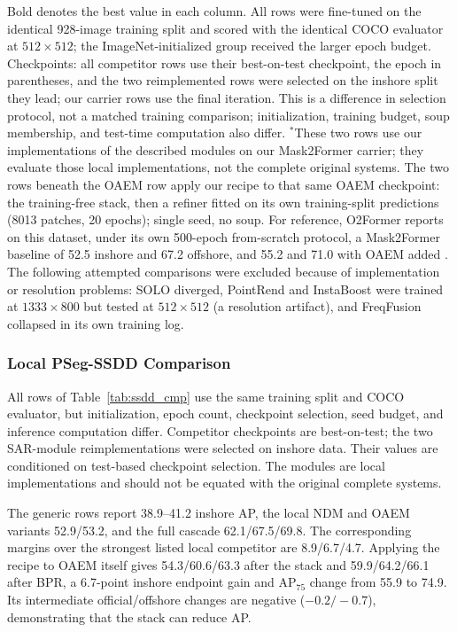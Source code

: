 \begin{table}[!t]
\parbox{\textwidth}{\footnotesize Bold denotes the best value in each column. All rows were fine-tuned on the identical 928-image training split and scored with the identical COCO evaluator at $512\times512$; the ImageNet-initialized group received the larger epoch budget. Checkpoints: all competitor rows use their best-on-test checkpoint, the epoch in parentheses, and the two reimplemented rows were selected on the inshore split they lead; our carrier rows use the final iteration. This is a difference in selection protocol, not a matched training comparison; initialization, training budget, soup membership, and test-time computation also differ. $^{\ast}$These two rows use our implementations of the described modules on our Mask2Former carrier; they evaluate those local implementations, not the complete original systems. The two rows beneath the OAEM row apply our recipe to that same OAEM checkpoint: the training-free stack, then a refiner fitted on its own training-split predictions (8013 patches, 20 epochs); single seed, no soup. For reference, O2Former reports on this dataset, under its own 500-epoch from-scratch protocol, a Mask2Former baseline of 52.5 inshore and 67.2 offshore, and 55.2 and 71.0 with OAEM added \cite{o2former2025}. The following attempted comparisons were excluded because of implementation or resolution problems: SOLO diverged, PointRend and InstaBoost were trained at $1333\times800$ but tested at $512\times512$ (a resolution artifact), and FreqFusion collapsed in its own training log.}
\end{table}



\subsubsection{Local PSeg-SSDD Comparison}\label{sec:exp:ssddcmp}
All rows of Table~\ref{tab:ssdd_cmp} use the same training split and COCO evaluator, but initialization, epoch count, checkpoint selection, seed budget, and inference computation differ. Competitor checkpoints are best-on-test; the two SAR-module reimplementations were selected on inshore data. Their values are conditioned on test-based checkpoint selection. The modules are local implementations and should not be equated with the original complete systems.

The generic rows report 38.9--41.2 inshore AP, the local NDM and OAEM variants 52.9/53.2, and the full cascade 62.1/67.5/69.8. The corresponding margins over the strongest listed local competitor are 8.9/6.7/4.7. Applying the recipe to OAEM itself gives 54.3/60.6/63.3 after the stack and 59.9/64.2/66.1 after BPR, a 6.7-point inshore endpoint gain and AP$_{75}$ change from 55.9 to 74.9. Its intermediate official/offshore changes are negative ($-0.2/-0.7$), demonstrating that the stack can reduce AP.

